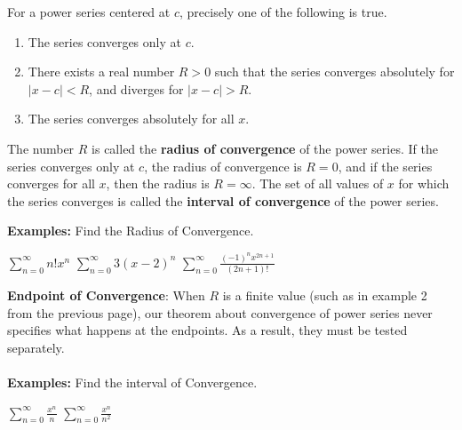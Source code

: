 \documentclass[addpoints, 12pt]{exam}
\begin{document}
\begin{tcolorbox}[title= CONVERGENCE OF A POWER SERIES,black,sharp corners,colback=white,colbacktitle=white,coltitle=black]

    For a power series centered at $c$, precisely one of the following is true.
    
    \begin{enumerate}
        \item The series converges only at $c$.
        \item There exists a real number $R>0$ such that the series converges absolutely for $|x-c|<R$, and diverges for $|x-c|>R$.
        \item The series converges absolutely for all $x$.
    \end{enumerate}
    The number $R$ is called the \textbf{radius of convergence} of the power series. If the series converges only at $c$, the radius of convergence is $R=0$, and if the series converges for all $x$, then the radius is $R=\infty$. The set of all values of $x$ for which the series converges is called the \textbf{interval of convergence} of the power series.

\end{tcolorbox}
\vspace{.1in}


\noindent\textbf{Examples:} Find the Radius of Convergence.
\begin{questions}
    \question $\displaystyle\sum_{n=0}^{\infty}n!x^n$
    \question $\displaystyle\sum_{n=0}^{\infty}3(x-2)^n$
    \question$\displaystyle\sum_{n=0}^{\infty}\frac{(-1)^n x^{2n+1}}{(2n+1)!}$
    

\end{questions}

\newpage


\noindent\textbf{Endpoint of Convergence}: When $R$ is a finite value (such as in example 2 from the previous page), our theorem about convergence of power series never specifies what happens at the endpoints. As a result, they must be tested separately.\\
\\
\noindent\textbf{Examples:} Find the interval of Convergence.
\begin{questions}
    \question $\displaystyle\sum_{n=0}^{\infty}\frac{x^n}{n}$
    \question$\displaystyle\sum_{n=0}^{\infty}\frac{x^n}{n^2}$
\end{questions}
\end{document}
